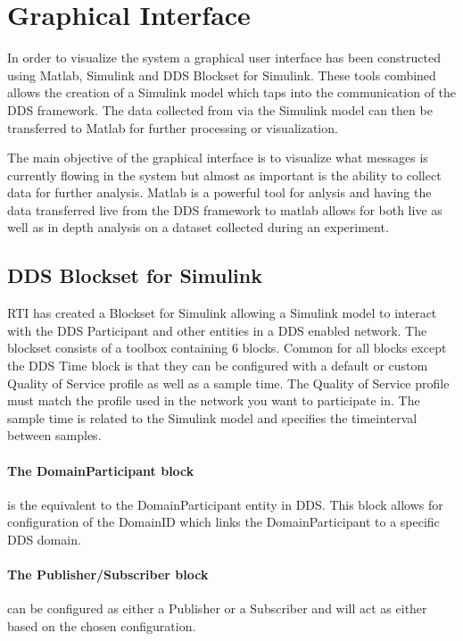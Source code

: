 \section{Graphical Interface}
In order to visualize the system a graphical user interface has been constructed using Matlab, Simulink and DDS Blockset for Simulink.
These tools combined allows the creation of a Simulink model which taps into the communication of the DDS framework.
The data collected from via the Simulink model can then be transferred to Matlab for further processing or visualization.

The main objective of the graphical interface is to visualize what messages is currently flowing in the system but almost as important is the ability to collect data for further analysis.
Matlab is a powerful tool for anlysis and having the data transferred live from the DDS framework to matlab allows for both live as well as in depth analysis on a dataset collected during an experiment.

\subsection{DDS Blockset for Simulink}
RTI has created a Blockset for Simulink allowing a Simulink model to interact with the DDS Participant and other entities in a DDS enabled network.
The blockset consists of a toolbox containing 6 blocks. Common for all blocks except the DDS Time block is that they can be configured with a default or custom Quality of Service profile as well as a sample time. The Quality of Service profile must match the profile used in the network you want to participate in. The sample time is related to the Simulink model and specifies the timeinterval between samples.

\paragraph{The DomainParticipant block} is the equivalent to the DomainParticipant entity in DDS. This block allows for configuration of the DomainID which links the DomainParticipant to a specific DDS domain.

\paragraph{The Publisher/Subscriber block} can be configured as either a Publisher or a Subscriber and will act as either based on the chosen configuration.

